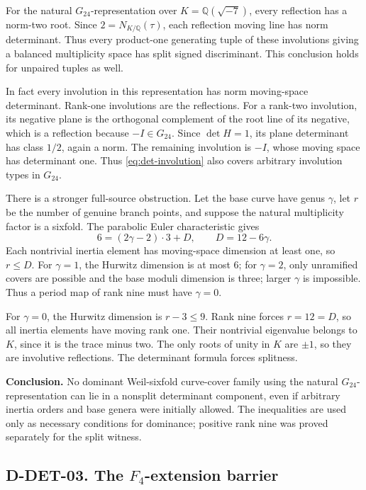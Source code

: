For the natural \(G_{24}\)-representation over
\(K=\mathbb Q(\sqrt{-7})\), every reflection has a norm-two root.
Since \(2=N_{K/\mathbb Q}(\tau)\), each reflection moving line has
norm determinant.  Thus every product-one generating tuple of these
involutions giving a balanced multiplicity space has split signed
discriminant.  This conclusion holds for unpaired tuples as well.

In fact every involution in this representation has norm moving-space
determinant.  Rank-one involutions are the reflections.  For a rank-two
involution, its negative plane is the orthogonal complement of the root
line of its negative, which is a reflection because \(-I\in G_{24}\).
Since \(\det H=1\), its plane determinant has class \(1/2\), again a
norm.  The remaining involution is \(-I\), whose moving space has
determinant one.  Thus \eqref{eq:det-involution} also covers arbitrary
involution types in \(G_{24}\).

There is a stronger full-source obstruction.  Let the base curve have
genus \(\gamma\), let \(r\) be the number of genuine branch points, and
suppose the natural multiplicity factor is a sixfold.  The parabolic
Euler characteristic gives
\[
             6=(2\gamma-2)\cdot3+D,\qquad D=12-6\gamma.
\]
Each nontrivial inertia element has moving-space dimension at least one,
so \(r\le D\).  For \(\gamma=1\), the Hurwitz dimension is at most
\(6\); for \(\gamma=2\), only unramified covers are possible and the
base moduli dimension is three; larger \(\gamma\) is impossible.
Thus a period map of rank nine must have \(\gamma=0\).

For \(\gamma=0\), the Hurwitz dimension is \(r-3\le9\).  Rank nine
forces \(r=12=D\), so all inertia elements have moving rank one.  Their
nontrivial eigenvalue belongs to \(K\), since it is the trace minus two.
The only roots of unity in \(K\) are \(\pm1\), so they are involutive
reflections.  The determinant formula forces splitness.

\textbf{Conclusion.} No dominant Weil-sixfold curve-cover family using
the natural \(G_{24}\)-representation can lie in a nonsplit determinant
component, even if arbitrary inertia orders and base genera were initially
allowed.  The inequalities are used only as necessary conditions for
dominance; positive rank nine was proved separately for the split witness.

\subsection*{D-DET-03. The \(F_4\)-extension barrier}

